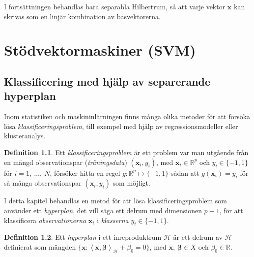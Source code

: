 \documentclass[a4paper, 12pt]{report}
\theoremstyle{definition}
\newtheorem{defi}{Definition}[section]
\theoremstyle{remark}
\newcommand{\bfbeta}{{\boldsymbol{\beta}}}
\newcommand{\bfx}{\mathbf{x}}
\newcommand{\llangle}{\left\langle}
\newcommand{\rrangle}{\right\rangle}
\newcommand{\inner}[2]{\llangle #1, #2 \rrangle}
\newcommand{\hil}{\mathcal{H}}
\begin{document}
I fortsättningen behandlas bara separabla Hilbertrum, så att varje vektor $\mathbf{x}$ kan skrivas som en linjär kombination av basvektorerna.

\chapter{Stödvektormaskiner (SVM)}

\section{Klassificering med hjälp av separerande hyperplan}

Inom statistiken och maskininlärningen finns många olika metoder för att försöka lösa \emph{klassificeringsproblem}, till exempel med hjälp av regressionsmodeller eller klusteranalys.

\begin{defi}
	Ett \textit{klassificeringsproblem} är ett problem var man utgående från en mängd observationspar (\textit{träningsdata}) $\left(\mathbf{x}_i, y_i\right)$, med $\mathbf{x}_i\in\mathbb{R}^p$ och $y_i\in\{-1, 1\}$ för $i=1,~\dots,~N$, försöker hitta en regel $g: \mathbb{R}^p \longmapsto \{-1, 1\}$ sådan att $g\left(\mathbf{x}_i\right)=y_i$ för så många observationspar $\left(\mathbf{x}_i, y_i\right)$ som möjligt.
\end{defi}

 I detta kapitel behandlas en metod för att lösa klassificeringsproblem som använder ett \emph{hyperplan}, det vill säga ett delrum med dimensionen $p-1$, för att klassificera \textit{observationerna} $\mathbf{x}_i$ i \textit{klasserna} $y_i\in\{-1, 1\}$.

\begin{defi}
	Ett \textit{hyperplan} i ett inreproduktrum $\mathcal{H}$ är ett delrum av $\mathcal{H}$ definierat som mängden $\{\mathbf{x}: \inner{\bfx}{\bfbeta}_\mathcal{H} + \beta_0=0\}$, med $\mathbf{x},~\bfbeta\in X$ och $\beta_0\in\mathbb{R}$.
\end{defi}
\end{document}
